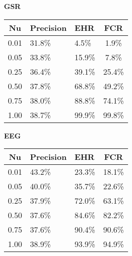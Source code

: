 \begin{table}[h]
  \centering
  \textbf{GSR}\vspace{2pt}
  \begin{tabularx}{\columnwidth}{cXXc}
    \toprule
    \textbf{Nu} & \textbf{Precision} & \textbf{EHR} & \textbf{FCR} \\
    \midrule
    0.01        & 31.8\%             & 4.5\%        & 1.9\%        \\ \hline
    0.05        & 33.8\%             & 15.9\%       & 7.8\%        \\ \hline
    0.25        & 36.4\%             & 39.1\%       & 25.4\%       \\ \hline
    0.50        & 37.8\%             & 68.8\%       & 49.2\%       \\ \hline
    0.75        & 38.0\%             & 88.8\%       & 74.1\%       \\ \hline
    1.00        & 38.7\%             & 99.9\%       & 99.8\%       \\ \hline
    \bottomrule
  \end{tabularx}

  \vspace{4pt}

  \textbf{EEG}\vspace{2pt}
  \begin{tabularx}{\columnwidth}{cXXc}
    \toprule
    \textbf{Nu} & \textbf{Precision} & \textbf{EHR} & \textbf{FCR} \\
    \midrule
    0.01        & 43.2\%             & 23.3\%       & 18.1\%       \\ \hline
    0.05        & 40.0\%             & 35.7\%       & 22.6\%       \\ \hline
    0.25        & 37.9\%             & 72.0\%       & 63.1\%       \\ \hline
    0.50        & 37.6\%             & 84.6\%       & 82.2\%       \\ \hline
    0.75        & 37.6\%             & 90.4\%       & 90.6\%       \\ \hline
    1.00        & 38.9\%             & 93.9\%       & 94.9\%       \\ \hline
    \bottomrule
  \end{tabularx}

  \vspace{4pt}


\end{table}
